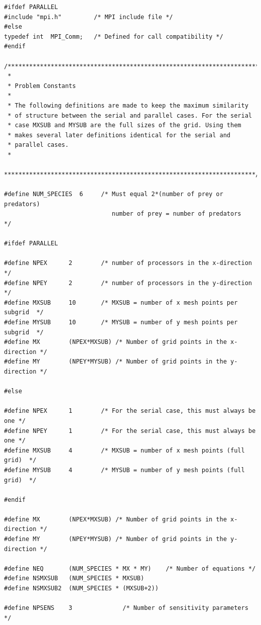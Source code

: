 \documentclass[11pt]{article}
\begin{document}
\begin{verbatim}
#ifdef PARALLEL
#include "mpi.h"         /* MPI include file */
#else
typedef int  MPI_Comm;   /* Defined for call compatibility */
#endif

/***********************************************************************
 *
 * Problem Constants
 *
 * The following definitions are made to keep the maximum similarity
 * of structure between the serial and parallel cases. For the serial
 * case MXSUB and MYSUB are the full sizes of the grid. Using them
 * makes several later definitions identical for the serial and
 * parallel cases.
 *
 **********************************************************************/

#define NUM_SPECIES  6     /* Must equal 2*(number of prey or predators)
                              number of prey = number of predators         */

#ifdef PARALLEL

#define NPEX      2        /* number of processors in the x-direction      */
#define NPEY      2        /* number of processors in the y-direction      */
#define MXSUB     10       /* MXSUB = number of x mesh points per subgrid  */
#define MYSUB     10       /* MYSUB = number of y mesh points per subgrid  */
#define MX        (NPEX*MXSUB) /* Number of grid points in the x-direction */
#define MY        (NPEY*MYSUB) /* Number of grid points in the y-direction */

#else

#define NPEX      1        /* For the serial case, this must always be one */
#define NPEY      1        /* For the serial case, this must always be one */
#define MXSUB     4        /* MXSUB = number of x mesh points (full grid)  */
#define MYSUB     4        /* MYSUB = number of y mesh points (full grid)  */

#endif

#define MX        (NPEX*MXSUB) /* Number of grid points in the x-direction */
#define MY        (NPEY*MYSUB) /* Number of grid points in the y-direction */

#define NEQ       (NUM_SPECIES * MX * MY)    /* Number of equations */
#define NSMXSUB   (NUM_SPECIES * MXSUB)
#define NSMXSUB2  (NUM_SPECIES * (MXSUB+2))

#define NPSENS    3              /* Number of sensitivity parameters */


\end{verbatim}
\end{document}
